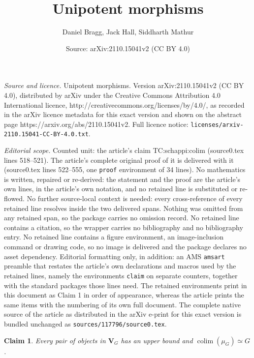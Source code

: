 \documentclass[10pt,a4paper]{amsart}
\title{Unipotent morphisms}
\author{Daniel Bragg, Jack Hall, Siddharth Mathur}
\date{Source: arXiv:2110.15041v2 (CC BY 4.0)}
\newtheorem{claim}{Claim}
\newcommand{\Vect}{\mathbf{V}}
\DeclareMathOperator{\colim}{colim}
\begin{document}
\maketitle

\noindent\emph{Source and licence.} Unipotent morphisms. Version arXiv:2110.15041v2 (CC BY 4.0), distributed by arXiv under the Creative Commons Attribution 4.0 International licence, http://creativecommons.org/licenses/by/4.0/, as recorded in the arXiv licence metadata for this exact version and shown on the abstract page https://arxiv.org/abs/2110.15041v2. Full licence notice: \texttt{licenses/arxiv-2110.15041-CC-BY-4.0.txt}.\par\smallskip

\noindent\textit{Editorial scope.} Counted unit: the article's claim TC:schappi:colim (source0.tex lines 518--521). The article's complete original proof of it is delivered with it (source0.tex lines 522--555, one \texttt{proof} environment of 34 lines). No mathematics is written, repaired or re-derived: the statement and the proof are the article's own lines, in the article's own notation, and no retained line is substituted or re-flowed.  No further source-local context is needed: every cross-reference of every retained line resolves inside the two delivered spans.  Nothing was omitted from any retained span, so the package carries no omission record.  No retained line contains a citation, so the wrapper carries no bibliography and no bibliography entry.  No retained line contains a figure environment, an image-inclusion command or drawing code, so no image is delivered and the package declares no asset dependency.  Editorial formatting only, in addition: an AMS \texttt{amsart} preamble that restates the article's own declarations and macros used by the retained lines, namely the environments \texttt{claim} on separate counters, together with the standard packages those lines need.  The retained environments print in this document as Claim 1 in order of appearance, whereas the article prints the same items with the numbering of its own full document.  The complete native source of the article as distributed in the arXiv e-print for this exact version is bundled unchanged as \texttt{sources/117796/source0.tex}.
  \begin{claim}\label{TC:schappi:colim}
    Every pair of objects in $\Vect_G$ has an upper bound and
    $\colim(\mu_G) \simeq G$.
  \end{claim}
\end{document}
